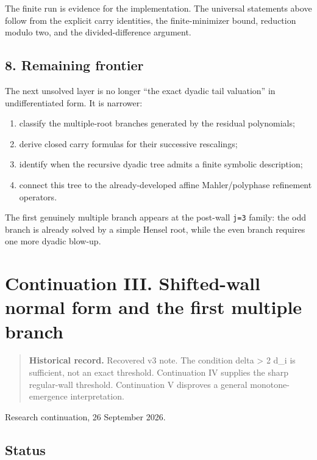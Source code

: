\documentclass[11pt,letterpaper]{article}
\providecommand{\tightlist}{\setlength{\itemsep}{0pt}\setlength{\parskip}{0pt}}
\begin{document}
The finite run is evidence for the implementation. The universal statements above follow from the explicit carry identities, the finite-minimizer bound, reduction modulo two, and the divided-difference argument.

\subsection{8. Remaining frontier}\label{remaining-frontier}

The next unsolved layer is no longer ``the exact dyadic tail valuation'' in undifferentiated form. It is narrower:

\begin{enumerate}
\def\labelenumi{\arabic{enumi}.}
\tightlist
\item
  classify the multiple-root branches generated by the residual polynomials;
\item
  derive closed carry formulas for their successive rescalings;
\item
  identify when the recursive dyadic tree admits a finite symbolic description;
\item
  connect this tree to the already-developed affine Mahler/polyphase refinement operators.
\end{enumerate}

The first genuinely multiple branch appears at the post-wall \texttt{j=3} family: the odd branch is already solved by a simple Hensel root, while the even branch requires one more dyadic blow-up.

\clearpage

\section{Continuation III. Shifted-wall normal form and the first multiple branch}\label{continuation-iii.-shifted-wall-normal-form-and-the-first-multiple-branch}

\begin{quote}
\textbf{Historical record.} Recovered v3 note. The condition delta \textgreater{} 2 d\_i is sufficient, not an exact threshold. Continuation IV supplies the sharp regular-wall threshold. Continuation V disproves a general monotone-emergence interpretation.
\end{quote}

Research continuation, 26 September 2026.

\subsection{Status}\label{status-1}
\end{document}
